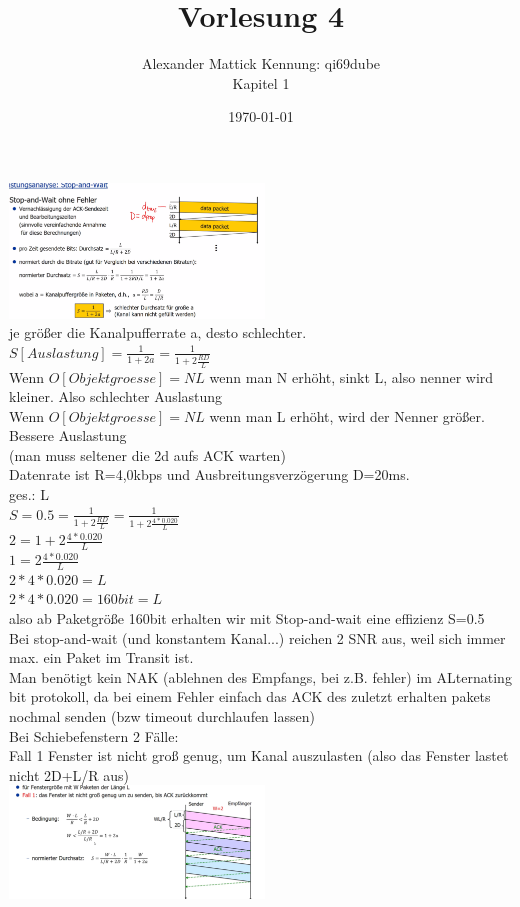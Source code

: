 \documentclass{article}
\author{
Alexander Mattick Kennung: qi69dube\\
Kapitel 1
}
\date{\today}
\title{Vorlesung 4}
\begin{document}
	\maketitle
	\includegraphics[width=256px]{Stop-And-Wait.png}\\
	je größer die Kanalpufferrate a, desto schlechter.\\
	$S[Auslastung]=\frac{1}{1+2a} = \frac{1}{1+2\frac{RD}{L}}$\\
	Wenn $O[Objektgroesse]=NL$ wenn man N erhöht, sinkt L, also nenner wird kleiner. Also schlechter Auslastung\\
	Wenn $O[Objektgroesse]=NL$ wenn man L erhöht, wird der Nenner größer. Bessere Auslastung\\
	(man muss seltener die 2d aufs ACK warten)\\
	Datenrate ist R=4,0kbps und Ausbreitungsverzögerung D=20ms.\\
	ges.: L\\
	$S=0.5 = \frac{1}{1+2\frac{RD}{L}} = \frac{1}{1+2\frac{4*0.020}{L}}$\\
	$2 = 1+2\frac{4*0.020}{L}$\\
	$1 = 2\frac{4*0.020}{L}$\\
	$2*4*0.020 = L$\\
	$2*4*0.020=160bit = L$\\
	also ab Paketgröße 160bit erhalten wir mit Stop-and-wait eine effizienz S=0.5\\
	Bei stop-and-wait (und konstantem Kanal...) reichen 2 SNR aus, weil sich immer max. ein Paket im Transit ist.\\
	Man benötigt kein NAK (ablehnen des Empfangs, bei z.B. fehler) im ALternating bit protokoll, da bei einem Fehler einfach das ACK des zuletzt erhalten pakets nochmal senden (bzw timeout durchlaufen lassen)\\
	Bei Schiebefenstern 2 Fälle:\\
	Fall 1 Fenster ist nicht groß genug, um Kanal auszulasten (also das Fenster lastet nicht 2D+L/R aus)\\
	\includegraphics[width=256px]{GOBACKNsmallwindow.png}\\
\end{document}

